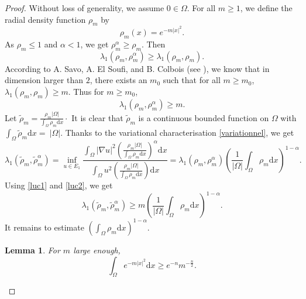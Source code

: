 \documentclass[12pt,reqno]{amsart}		%
\theoremstyle{plain}
\newtheorem{lemma}[thm]{Lemma}
\theoremstyle{definition}
\theoremstyle{remark}
\numberwithin{equation}{section}
\newcommand{\R}{\mathbb{R}}
\renewcommand{\d}{\mathrm{d}}
\begin{document}
\begin{proof}
Without loss of generality, we assume $0\in \Omega$.
For all $m\geqslant 1$, we define the radial density function $\rho_{m}$ by
	\[
	\rho_m(x) = e^{-m|x|^2}.
	\]
	As $\rho_m \leqslant 1$ and $\alpha < 1$, we get $\rho_m^{\alpha} \geqslant\rho_m$. Then
	\[
	\lambda_{1}(\rho_m,\rho_m^{\alpha}) \geqslant \lambda_{1}(\rho_m,\rho_m).
	\]
According to A. Savo, A. El Soufi, and B. Colbois (see \cite[Theorem 5.2]{colbois_soufi_savo_2015}), we know that in dimension larger than $2$, there exists an $m_0$ such that for all $m\geqslant m_0$, $\lambda_{1} (\rho_m,\rho_m) \geqslant m$.
	Thus for $m\geqslant m_0$, 
	\begin{equation}
	\label{luc1}
	\lambda_{1}(\rho_m,\rho_m^{\alpha}) \geqslant m.
	\end{equation}
	Let $\tilde{\rho}_{m}=\frac{\rho_{m}|\Omega|}{\int_{\Omega}\rho_{m}\d x}\cdot$ It is clear that $\tilde{\rho}_{m}$ is a continuous bounded function on $\Omega$ with $\int_{\Omega}\tilde{\rho}_{m}\d x=~|\Omega|$.
	Thanks to the variational characterisation \eqref{variationnel}, we get
	\begin{equation}
	\label{luc2}
	\lambda_{1}(\tilde{\rho}_{m},\tilde{\rho}_{m}^{\alpha})
	= \underset{u\in E_{1}}{\inf}
	 \frac{\int_\Omega|\nabla u|^2 \left(\frac{\rho_{m}|\Omega|}{\int_{\Omega}\rho_{m}\d x}\right)^{\alpha} \d x}{\int_\Omega u^2 \left(\frac{\rho_{m}|\Omega|}{\int_{\Omega}\rho_{m}\d x}\right) \d x}
	 =	\lambda_{1}(\rho_m,\rho_m^{\alpha})
	\left(\frac{1}{|\Omega|}\int_{\Omega} \rho_{m}\d x\right)^{1-\alpha} .
	\end{equation}
	Using \eqref{luc1} and \eqref{luc2}, we get
	\[\lambda_{1}(\tilde{\rho}_{m},\tilde{\rho}_{m}^{\alpha})\geqslant m \left(\frac{1}{|\Omega|}\int_{\Omega}\rho_{m}\d x\right)^{1-\alpha}.\]
	It remains to estimate $\left(\int_{\Omega} \rho_m \d x\right)^{1-\alpha}$.
	
\begin{lemma}
\label{minoration_integrale}
	 For $m$ large enough,
	\begin{equation*}
	\int_{\Omega} e^{-m|x|^2}\d x
	\geqslant
	e^{-n} m^{-\frac{n}{2}}.
	\end{equation*}
\end{lemma}
	

\end{proof}
\end{document}
